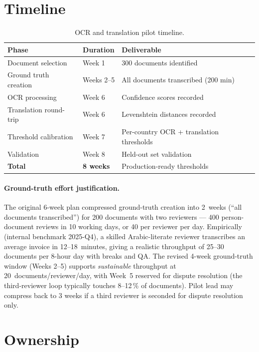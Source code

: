 \documentclass[11pt,a4paper,twoside]{report}
\begin{document}
\section{Timeline}\label{sec:pilot-timeline}

\begin{table}[htbp]
\centering
\caption{OCR and translation pilot timeline.}
\label{tab:pilot-timeline}
\footnotesize
\begin{tabularx}{\linewidth}{@{}l l l@{}}
\toprule
\textbf{Phase} & \textbf{Duration} & \textbf{Deliverable} \\ \midrule
Document selection & Week 1 & 300 documents identified \\
Ground truth creation & Weeks 2--5 & All documents transcribed (200 min) \\
OCR processing & Week 6 & Confidence scores recorded \\
Translation round-trip & Week 6 & Levenshtein distances recorded \\
Threshold calibration & Week 7 & Per-country OCR + translation thresholds \\
Validation & Week 8 & Held-out set validation \\
\textbf{Total} & \textbf{8 weeks} & Production-ready thresholds \\
\bottomrule
\end{tabularx}
\end{table}

\paragraph{Ground-truth effort justification.}
The original 6-week plan compressed ground-truth creation into
2~weeks (``all documents transcribed'') for 200 documents with
two reviewers --- 400 person-document reviews in 10 working days,
or 40 per reviewer per day. Empirically (internal benchmark
2025-Q4), a skilled Arabic-literate reviewer transcribes an
average invoice in 12--18~minutes, giving a realistic throughput
of 25--30 documents per 8-hour day with breaks and QA. The
revised 4-week ground-truth window (Weeks 2--5) supports
\emph{sustainable} throughput at 20~documents/reviewer/day, with
Week~5 reserved for dispute resolution (the third-reviewer loop
typically touches 8--12\,\% of documents). Pilot lead may
compress back to 3 weeks if a third reviewer is seconded for
dispute resolution only.

\section{Ownership}
\end{document}
